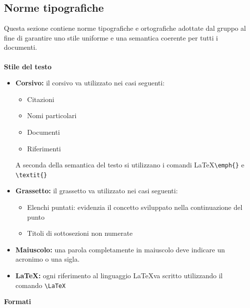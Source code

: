 \documentclass[a4paper]{report}
\begin{document}
	\subsection{Norme tipografiche}
	Questa sezione contiene norme tipografiche e ortografiche adottate dal gruppo al fine di garantire uno stile
	uniforme e una semantica coerente per tutti i documenti.  \\ \\
	\textbf{Stile del testo} 
	\begin{itemize}
		\item \textbf{Corsivo:} il corsivo va utilizzato nei casi seguenti:
		\begin{itemize}
			\item Citazioni
			\item Nomi particolari
			\item Documenti
			\item Riferimenti
		\end{itemize}
		A seconda della semantica del testo si utilizzano i comandi \LaTeX \space \verb|\emph{}| e \verb|\textit{}|
		\item \textbf{Grassetto:} il grassetto va utilizzato nei casi seguenti:
		\begin{itemize}
			\item Elenchi puntati: evidenzia il concetto sviluppato nella continuazione del punto
			\item Titoli di sottosezioni non numerate
		\end{itemize}
		\item \textbf{Maiuscolo:} una parola completamente in maiuscolo deve indicare un acronimo o una sigla.
		\item \textbf{\LaTeX:} ogni riferimento al linguaggio \LaTeX \space va scritto utilizzando il comando
		\verb|\LaTeX|
	\end{itemize}
	\textbf{Formati} 
\end{document}
